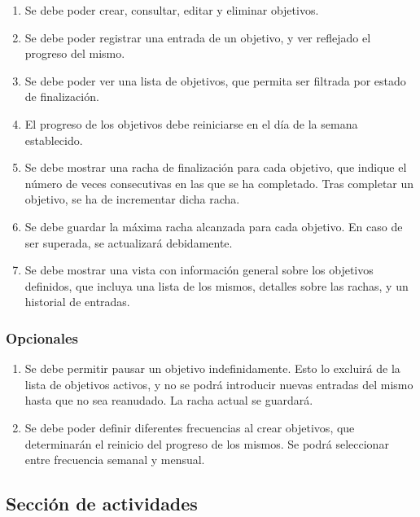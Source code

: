 \documentclass[10pt, a4paper]{aqademic}
\begin{document}
\begin{enumerate}
	\item Se debe poder crear, consultar, editar y eliminar objetivos.
	
	\item Se debe poder registrar una entrada de un objetivo, y ver reflejado el progreso del mismo.
	
	\item Se debe poder ver una lista de objetivos, que permita ser filtrada por estado de finalización.
	
	\item El progreso de los objetivos debe reiniciarse en el día de la semana establecido.
	
	\item Se debe mostrar una racha de finalización para cada objetivo, que indique el número de veces consecutivas en las que se ha completado. Tras completar un objetivo, se ha de incrementar dicha racha.
	
	\item Se debe guardar la máxima racha alcanzada para cada objetivo. En caso de ser superada, se actualizará debidamente.
	
	\item Se debe mostrar una vista con información general sobre los objetivos definidos, que incluya una lista de los mismos, detalles sobre las rachas, y un historial de entradas.
\end{enumerate}


\subsubsection*{Opcionales}

\begin{enumerate}[resume]
	\item Se debe permitir pausar un objetivo indefinidamente. Esto lo excluirá de la lista de objetivos activos, y no se podrá introducir nuevas entradas del mismo hasta que no sea reanudado. La racha actual se guardará.
	
	\item Se debe poder definir diferentes frecuencias al crear objetivos, que determinarán el reinicio del progreso de los mismos. Se podrá seleccionar entre frecuencia semanal y mensual.
\end{enumerate}


\subsection*{Sección de actividades}
\end{document}
